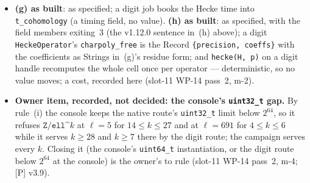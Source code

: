 \documentclass[11pt]{article}
\theoremstyle{remark}
\begin{document}
\begin{itemize}
  (\texttt{Campaign/CampaignRing.cpp}). \emph{v1.12.1} (the slot-11 WP-15 referee's M-2): v1.12.0 listed
  five keys and omitted \texttt{"e"}; this paragraph is the record's only inventory of the object, and
  (b) makes that inventory binding for a non-default-ring record, so the sixth key is named here.
\item \textbf{(g) as built}: as specified; a digit job books the Hecke time into \texttt{t\_cohomology}
  (a timing field, no value). \textbf{(h) as built}: as specified, with the field members exiting~$3$
  (the v1.12.0 sentence in~(h) above); a digit \texttt{HeckeOperator}'s \texttt{charpoly\_free} is the Record
  \texttt{\{precision, coeffs\}} with the coefficients as Strings in~(g)'s residue form; and
  \texttt{hecke(H, p)} on a digit handle recomputes the whole cell once per operator --- deterministic,
  so no value moves; a cost, recorded here (slot-11 WP-14 pass~2, m-2).
\item \textbf{Owner item, recorded, not decided: the console's \texttt{uint32\_t} gap.} By rule~(i) the
  console keeps the native route's \texttt{uint32\_t} limit below $2^{64}$, so it refuses
  $\texttt{Z/ell\textasciicircum}k$ at $\ell=5$ for $14\le k\le27$ and at $\ell=691$ for $4\le k\le6$ while
  it serves $k\ge28$ and $k\ge7$ there by the digit route; the campaign serves every $k$. Closing it
  (the console's \texttt{uint64\_t} instantiation, or the digit route below $2^{64}$ at the console) is the
  owner's to rule (slot-11 WP-14 pass~2, m-4; [P] v3.9).
\end{itemize}
\end{document}
